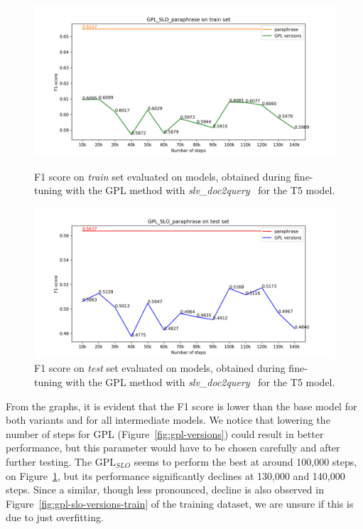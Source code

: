 \documentclass[fleqn,moreauthors,10pt]{ds_report}
\begin{document}
\begin{figure}
    \centering
    \begin{minipage}{0.5\textwidth}
        \centering
        \includegraphics[width=\linewidth]{graphs/GPL_SLO_paraphrase_train.png}
        \caption{F1 score on \textit{train} set evaluated on models, obtained during fine-tuning with the GPL method with {\it slv\_doc2query}~\cite{boshko} for the T5 model.}
		\label{fig:gpl-slo-versions-train}
    \end{minipage}\hfill
    \begin{minipage}{0.5\textwidth}
        \centering
        \includegraphics[width=\linewidth]{graphs/GPL_SLO_paraphrase_test.png}
        \caption{F1 score on \textit{test} set evaluated on models, obtained during fine-tuning with the GPL method with {\it slv\_doc2query}~\cite{boshko} for the T5 model.}
		\label{fig:gpl-slo-versions}
    \end{minipage}
\end{figure}

From the graphs, it is evident that the F1 score is lower than the base model for both variants and for all intermediate models. We notice that lowering the number of steps for GPL (Figure~\ref{fig:gpl-versions}) could result in better performance, but this parameter would have to be chosen carefully and after further testing. The $\text{GPL}_{SLO}$ seems to perform the best at around 100,000 steps, on Figure~\ref{fig:gpl-slo-versions}, but its performance significantly declines at 130,000 and 140,000 steps. Since a similar, though less pronounced, decline is also observed in Figure~\ref{fig:gpl-slo-versions-train} of the training dataset, we are unsure if this is due to just overfitting.
\end{document}
